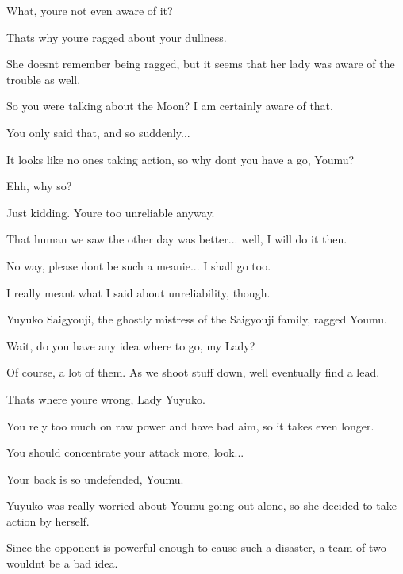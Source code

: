 \begin{tcolorbox}[breakable, colback=white, colframe=black!80,
  boxrule=0.6pt, arc=0mm, left=3mm, right=3mm, top=2mm, bottom=2mm]
\textquotedbl{}What, you\textquotesingle{}re not even aware of it?\par
That\textquotesingle{}s why you\textquotesingle{}re ragged about your dullness.\textquotedbl{}\par
She doesn\textquotesingle{}t remember being ragged, but it seems that her lady was aware of the trouble as well.\par
\textquotedbl{}So you were talking about the Moon? I am certainly aware of that.\par
You only said that, and so suddenly...\textquotedbl{}\par
\textquotedbl{}It looks like no one\textquotesingle{}s taking action, so why don\textquotesingle{}t you have a go, Youmu?\textquotedbl{}\par
\textquotedbl{}Ehh, why so?\textquotedbl{}\par
\textquotedbl{}Just kidding. You\textquotesingle{}re too unreliable anyway.\par
That human we saw the other day was better... well, I will do it then.\textquotedbl{}\par
\textquotedbl{}No way, please don\textquotesingle{}t be such a meanie... I shall go too.\textquotedbl{}\par
\textquotedbl{}I really meant what I said about unreliability, though.\textquotedbl{}\par
Yuyuko Saigyouji, the ghostly mistress of the Saigyouji family, ragged Youmu.\par
\textquotedbl{}Wait, do you have any idea where to go, my Lady?\textquotedbl{}\par
\textquotedbl{}Of course, a lot of them. As we shoot stuff down, we\textquotesingle{}ll eventually find a lead.\textquotedbl{}\par
\textquotedbl{}That\textquotesingle{}s where you\textquotesingle{}re wrong, Lady Yuyuko.\par
You rely too much on raw power and have bad aim, so it takes even longer.\par
You should concentrate your attack more, look...\textquotedbl{}\par
\textquotedbl{}Your back is so undefended, Youmu.\textquotedbl{}\par
Yuyuko was really worried about Youmu going out alone, so she decided to take action by herself.\par
Since the opponent is powerful enough to cause such a disaster, a team of two wouldn\textquotesingle{}t be a bad idea.\par

\end{tcolorbox}
